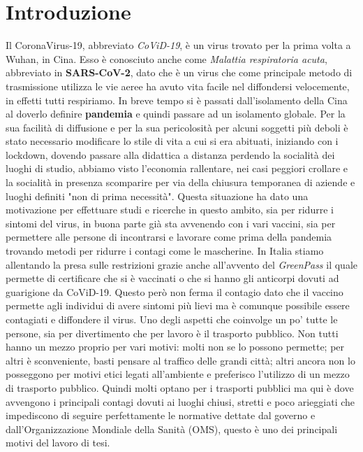 \documentclass[12pt, openany]{book}
\begin{document}
	\chapter*{Introduzione}	
		Il CoronaVirus-19, abbreviato \emph{CoViD-19}, è un virus trovato per la prima volta a Wuhan, in Cina. Esso è conosciuto anche come \emph{Malattia respiratoria acuta}, abbreviato in \textbf{SARS-CoV-2}, dato che è un virus che come principale metodo di trasmissione utilizza le vie aeree ha avuto vita facile nel diffondersi velocemente, in effetti tutti respiriamo. In breve tempo si è passati dall'isolamento della Cina al doverlo definire \textbf{pandemia} e quindi passare ad un isolamento globale.
		Per la sua facilità di diffusione e per la sua pericolosità per alcuni soggetti più deboli è stato necessario modificare lo stile di vita a cui si era abituati, iniziando con i lockdown, dovendo passare alla didattica a distanza perdendo la socialità dei luoghi di studio, abbiamo visto l'economia rallentare, nei casi peggiori crollare e la socialità in presenza scomparire per via della chiusura temporanea di aziende e luoghi definiti "non di prima necessità".
		Questa situazione ha dato una motivazione per effettuare studi e ricerche in questo ambito, sia per ridurre i sintomi del virus, in buona parte già sta avvenendo con i vari vaccini, sia per permettere alle persone di incontrarsi e lavorare come prima della pandemia trovando metodi per ridurre i contagi come le mascherine. In Italia stiamo allentando la presa sulle restrizioni grazie anche all'avvento del \emph{GreenPass} il quale permette di certificare che si è vaccinati o che si hanno gli anticorpi dovuti ad guarigione da CoViD-19. Questo però non ferma il contagio dato che il vaccino permette agli individui di avere sintomi più lievi ma è comunque possibile essere contagiati e diffondere il virus. 
		Uno degli aspetti che coinvolge un po' tutte le persone, sia per divertimento che per lavoro è il trasporto pubblico. Non tutti hanno un mezzo proprio per vari motivi: molti non se lo possono permette; per altri è sconveniente, basti pensare al traffico delle grandi città; altri ancora non lo posseggono per motivi etici legati all'ambiente e preferisco l'utilizzo di un mezzo di trasporto pubblico. Quindi molti optano per i trasporti pubblici ma qui è dove avvengono i principali contagi dovuti ai luoghi chiusi, stretti e poco arieggiati che impediscono di seguire perfettamente le normative dettate dal governo e dall'Organizzazione Mondiale della Sanità (OMS), questo è uno dei principali motivi del lavoro di tesi.\\
\end{document}
